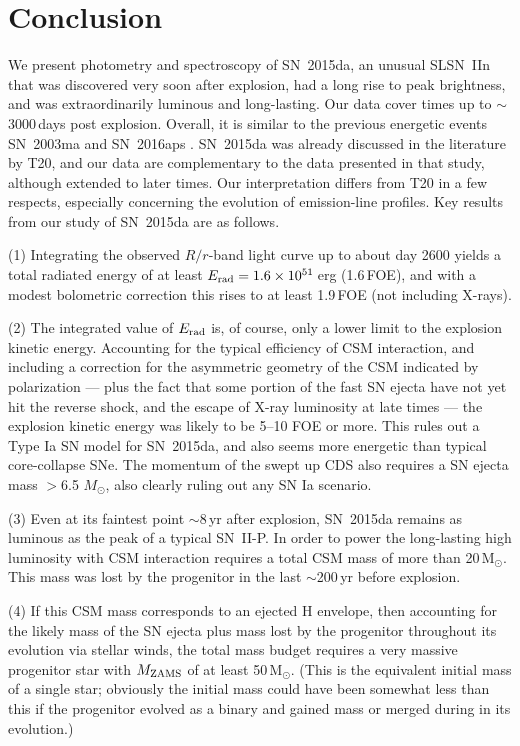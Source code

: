 \documentclass[fleqn,usenatbib,useAMS]{mnras}
\begin{document}
\section{Conclusion} \label{conclusion}

We present photometry and spectroscopy of SN~2015da, an unusual SLSN~IIn that was discovered very soon after explosion, had a long rise to peak brightness, and was extraordinarily luminous and long-lasting.  Our data cover times up to $\sim$3000\,days post explosion.  Overall, it is similar to the previous energetic events SN~2003ma \citep{rest11} and SN~2016aps \citep{nicholl20}.  SN~2015da was already discussed in the literature by T20, and our data are complementary to the data presented in that study, although extended to later times.  Our interpretation differs from T20 in a few respects, especially concerning the evolution of emission-line profiles. Key results from our study of SN~2015da are as follows.

(1) Integrating the observed $R/r$-band light curve up to about day 2600 yields a total radiated energy of at least $E_{\rm rad} = 1.6 \times 10^{51}$\,erg (1.6\,FOE), and with a modest bolometric correction this rises to at least 1.9\,FOE (not including X-rays). 

(2) The integrated value of $E_{\rm rad}$ is, of course, only a lower limit to the explosion kinetic energy.  Accounting for the typical efficiency of CSM interaction, and including a correction for the asymmetric geometry of the CSM indicated by polarization \citep{bilinski23} --- plus the fact that some portion of the fast SN ejecta have not yet hit the reverse shock, and the escape of X-ray luminosity at late times ---  the explosion kinetic energy was likely to be 5--10 FOE or more.  This rules out a Type Ia SN model for SN~2015da, and also seems more energetic than typical core-collapse SNe.  The momentum of the swept up CDS also requires a SN ejecta mass $>$6.5 $M_{\odot}$, also clearly ruling out any SN Ia scenario.

(3) Even at its faintest point $\sim$8\,yr after explosion, SN~2015da remains as luminous as the peak of a typical SN~II-P.  In order to power the long-lasting high luminosity with CSM interaction requires a total CSM mass of more than 20\,M$_{\odot}$.  This mass was lost by the progenitor in the last $\sim$200\,yr before explosion.  

(4) If this CSM mass corresponds to an ejected H envelope, then accounting for the likely mass of the SN ejecta plus mass lost by the progenitor throughout its evolution via stellar winds, the total mass budget requires a very massive progenitor star with $M_{\rm ZAMS}$ of at least 50\,M$_{\odot}$. (This is the equivalent initial mass of a single star; obviously the initial mass could have been somewhat less than this if the progenitor evolved as a binary and gained mass or merged during in its evolution.)
\end{document}
